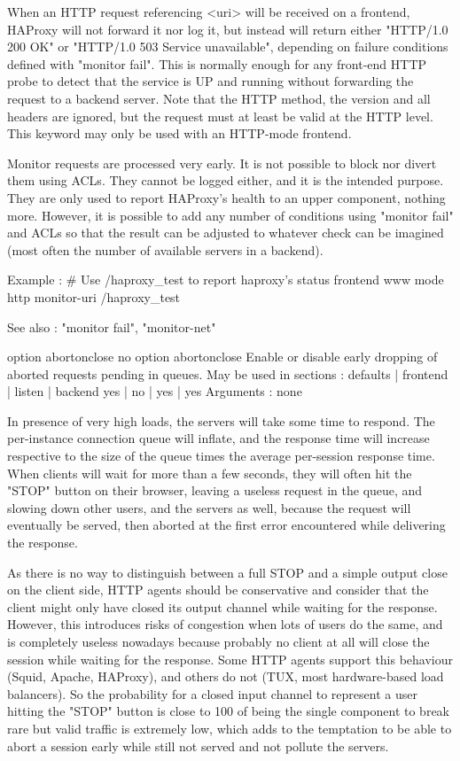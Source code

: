   When an HTTP request referencing <uri> will be received on a frontend,
  HAProxy will not forward it nor log it, but instead will return either
  "HTTP/1.0 200 OK" or "HTTP/1.0 503 Service unavailable", depending on failure
  conditions defined with "monitor fail". This is normally enough for any
  front-end HTTP probe to detect that the service is UP and running without
  forwarding the request to a backend server. Note that the HTTP method, the
  version and all headers are ignored, but the request must at least be valid
  at the HTTP level. This keyword may only be used with an HTTP-mode frontend.

  Monitor requests are processed very early. It is not possible to block nor
  divert them using ACLs. They cannot be logged either, and it is the intended
  purpose. They are only used to report HAProxy's health to an upper component,
  nothing more. However, it is possible to add any number of conditions using
  "monitor fail" and ACLs so that the result can be adjusted to whatever check
  can be imagined (most often the number of available servers in a backend).

  Example :
    # Use /haproxy_test to report haproxy's status
    frontend www
        mode http
        monitor-uri /haproxy_test

  See also : "monitor fail", "monitor-net"


option abortonclose
no option abortonclose
  Enable or disable early dropping of aborted requests pending in queues.
  May be used in sections :   defaults | frontend | listen | backend
                                 yes   |     no   |   yes  |   yes
  Arguments : none

  In presence of very high loads, the servers will take some time to respond.
  The per-instance connection queue will inflate, and the response time will
  increase respective to the size of the queue times the average per-session
  response time. When clients will wait for more than a few seconds, they will
  often hit the "STOP" button on their browser, leaving a useless request in
  the queue, and slowing down other users, and the servers as well, because the
  request will eventually be served, then aborted at the first error
  encountered while delivering the response.

  As there is no way to distinguish between a full STOP and a simple output
  close on the client side, HTTP agents should be conservative and consider
  that the client might only have closed its output channel while waiting for
  the response. However, this introduces risks of congestion when lots of users
  do the same, and is completely useless nowadays because probably no client at
  all will close the session while waiting for the response. Some HTTP agents
  support this behaviour (Squid, Apache, HAProxy), and others do not (TUX, most
  hardware-based load balancers). So the probability for a closed input channel
  to represent a user hitting the "STOP" button is close to 100%
  of being the single component to break rare but valid traffic is extremely
  low, which adds to the temptation to be able to abort a session early while
  still not served and not pollute the servers.

